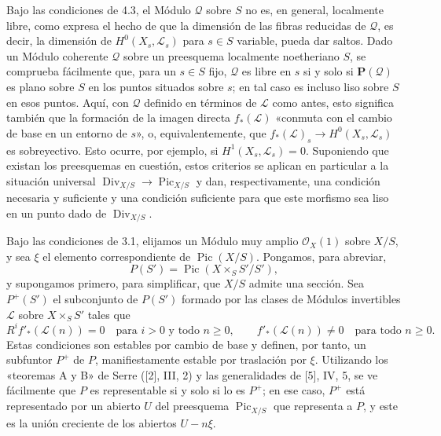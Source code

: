  Bajo las condiciones de 4.3, el Módulo $\mathcal Q$
sobre $S$ no es, en general, localmente libre, como expresa el hecho de que la
dimensión de las fibras reducidas de $\mathcal Q$, es decir, la dimensión de
$H^0(X_s,\mathcal L_s)$ para $s\in S$ variable, pueda dar saltos. Dado un
Módulo coherente $\mathcal Q$ sobre un preesquema localmente noetheriano $S$,
se comprueba fácilmente que, para un $s\in S$ fijo, $\mathcal Q$ es libre en
$s$ si y solo si $\mathbf P(\mathcal Q)$ es plano sobre $S$ en los puntos
situados sobre $s$; en tal caso es incluso liso sobre $S$ en esos puntos. Aquí,
con $\mathcal Q$ definido en términos de $\mathcal L$ como antes, esto significa
también que la formación de la imagen directa $f_*(\mathcal L)$ «conmuta con el
cambio de base
en un entorno de $s$», o, equivalentemente, que
$f_*(\mathcal L)_s\longrightarrow H^0(X_s,\mathcal L_s)$ es sobreyectivo. Esto
ocurre, por ejemplo, si $H^1(X_s,\mathcal L_s)=0$. Suponiendo que existan los
preesquemas en cuestión, estos criterios se aplican en particular a la situación
universal $\operatorname{Div}_{X/S}\longrightarrow\operatorname{Pic}_{X/S}$ y
dan, respectivamente, una condición necesaria y suficiente y una condición
suficiente para que este morfismo sea liso en un punto dado de
$\operatorname{Div}_{X/S}$.


Bajo las condiciones de 3.1, elijamos un Módulo muy amplio $\mathcal O_X(1)$
sobre $X/S$, y sea $\xi$ el elemento correspondiente de
$\operatorname{Pic}(X/S)$. Pongamos, para abreviar,
\[
P(S')=\operatorname{Pic}(X\times_SS'/S'),
\]
y supongamos primero, para simplificar, que $X/S$ admite una sección. Sea
$P^+(S')$ el subconjunto de $P(S')$ formado por las clases de Módulos
invertibles $\mathcal L$ sobre $X\times_SS'$ tales que
\[
R^if'_*(\mathcal L(n))=0\quad\text{para $i>0$ y todo $n\geq0$},
\qquad
f'_*(\mathcal L(n))\neq0\quad\text{para todo $n\geq0$}.
\]
Estas condiciones son estables por cambio de base y definen, por tanto, un
subfuntor $P^+$ de $P$, manifiestamente estable por traslación por $\xi$.
Utilizando los «teoremas A y B» de Serre ([2], III, 2) y las generalidades de
[5], IV, 5, se ve fácilmente que $P$ es representable si y solo si lo es $P^+$;
en ese caso, $P^+$ está representado por un abierto $U$ del preesquema
$\operatorname{Pic}_{X/S}$ que representa a $P$, y este es la unión creciente
de los abiertos $U-n\xi$.

